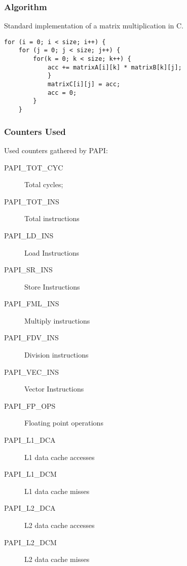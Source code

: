 \documentclass{beamer}
\begin{document}
\begin{frame}[fragile]
	\frametitle{Algorithm}

Standard implementation of a matrix multiplication in C.

\begin{verbatim}
for (i = 0; i < size; i++) {
    for (j = 0; j < size; j++) {
        for(k = 0; k < size; k++) {
            acc += matrixA[i][k] * matrixB[k][j];				
            }		
            matrixC[i][j] = acc;	
            acc = 0;
        }
    }
\end{verbatim}
\end{frame}

\begin{frame}
	\frametitle{Counters Used}

	Used counters gathered by PAPI:
	\begin{description}
		\item[PAPI\_TOT\_CYC] Total cycles;
		\item[PAPI\_TOT\_INS] Total instructions
		\item[PAPI\_LD\_INS] Load Instructions
		\item[PAPI\_SR\_INS] Store Instructions
		\item[PAPI\_FML\_INS] Multiply instructions
		\item[PAPI\_FDV\_INS] Division instructions
		\item[PAPI\_VEC\_INS] Vector Instructions
		\item[PAPI\_FP\_OPS] Floating point operations
		\item[PAPI\_L1\_DCA] L1 data cache accesses
		\item[PAPI\_L1\_DCM] L1 data cache misses
		\item[PAPI\_L2\_DCA] L2 data cache accesses
		\item[PAPI\_L2\_DCM] L2 data cache misses
	\end{description}
\end{frame}
\end{document}
